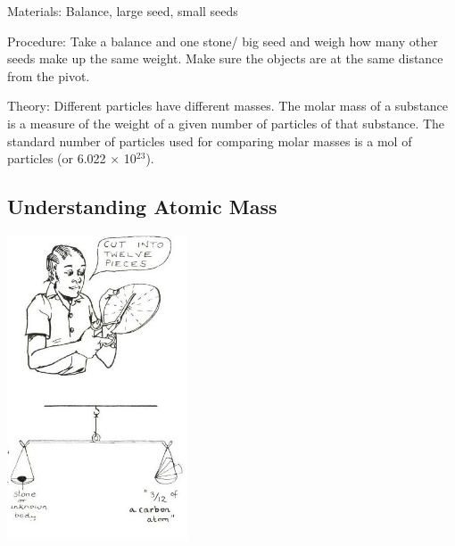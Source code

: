 \begin{multicols}{2}
\begin{description*}
\item[Materials:]{Balance, large seed, small seeds}
\item[Procedure:]{Take a balance and one stone/
big seed and weigh how
many other seeds make up the same weight. Make sure the objects are at the same distance
from the pivot.}
\item[Theory:]{Different particles have different masses. The molar mass of a substance is a measure of the weight of a given number of particles of that substance. The standard number of particles used for comparing molar masses is a mol of particles (or 6.022 $\times$ 10$^{23}$).}
\end{description*}

\subsection{Understanding Atomic Mass} 

\begin{center}
\includegraphics[width=0.4\textwidth]{./img/source/atomic-mass.jpg}
\end{center}


\end{multicols}
